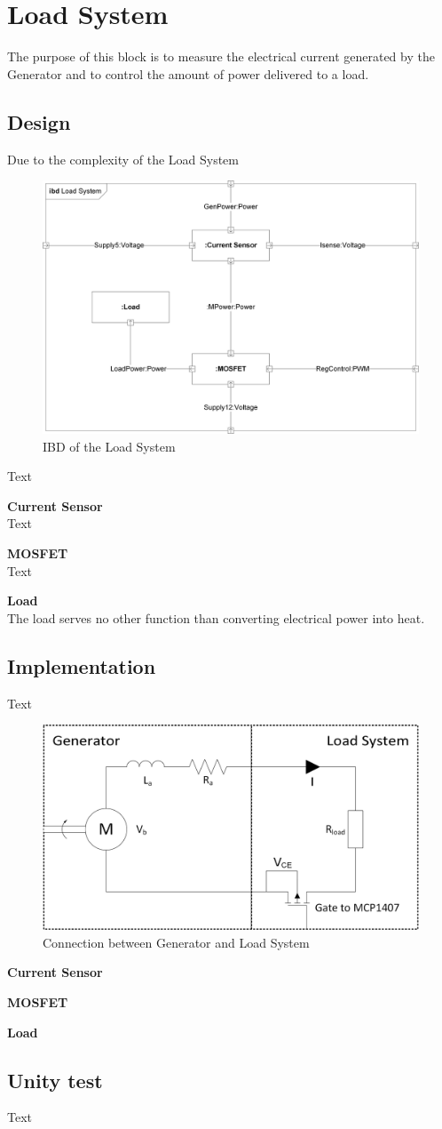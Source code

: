 \newpage
\section{Load System}
The purpose of this block is to measure the electrical current generated by the Generator and to control the amount of power delivered to a load.

\subsection{Design}
Due to the complexity of the Load System

\begin{figure}[H]
	\centering
	\includegraphics[width=0.7\linewidth]{Hardware/Pictures/IBD_LoadSystem}
	\caption{IBD of the Load System}
	\label{fig:IBD_Load_System}
\end{figure}

Text

\textbf{Current Sensor}\\
Text

\textbf{MOSFET}\\
Text

\textbf{Load}\\
The load serves no other function than converting electrical power into heat.

\subsection{Implementation}
Text

\begin{figure}[H]
	\centering
	\includegraphics[width=0.7\linewidth]{Hardware/Pictures/LoadSystem}
	\caption{Connection between Generator and Load System}
	\label{fig:Load_System}
\end{figure}

\textbf{Current Sensor}

\textbf{MOSFET}

\textbf{Load}

\subsection{Unity test}
Text